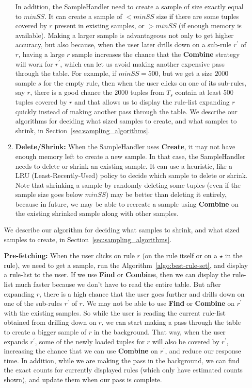 \begin{enumerate}
In addition, the SampleHandler need to create a sample of size exactly equal to $minSS$. It can create a sample of $< minSS$ size if there are some tuples covered by $r$ present in existing samples, or $> minSS$ (if enough memory is available). Making a larger sample is advantageous not only to get higher accuracy, but also because, when the user later drills down on a sub-rule $r^{\prime}$ of $r$, having a large $r$ sample increases the chance that the \textbf{Combine} strategy will work for $r^{\prime}$, which can let us avoid making another expensive pass through the table. For example, if $minSS = 500$, but we get a size $2000$ sample $s$ for the empty rule, then when the user clicks on one of its sub-rules, say $r$, there is a good chance the $2000$ tuples from $T_s$ contain at least $500$ tuples covered by $r$ and that allows us to display the rule-list expanding $r$ quickly instead of making another pass through the table. We describe our algorithms for deciding what sized samples to create, and what samples to shrink, in Section~\ref{sec:sampling_algorithms}.

\item \textbf{Delete/Shrink:} When the SampleHandler uses \textbf{Create}, it may not have enough memory left to create a new sample. In that case, the SampleHandler needs to delete or shrink an existing sample. It can use a heuristic, like a LRU (Least-Recently-Used) policy to decide which sample to delete or shrink. Note that shrinking a sample by randomly deleting some tuples (even if the sample size goes below $minSS$) may be better than deleting it entirely, because in future, we may be able to recreate a sample using \textbf{Combine} on the existing shrinked sample along with other samples.
\end{enumerate}

We describe our algorithm for deciding what samples to shrink, and what sized samples to create, in Section~\ref{sec:sampling_algorithms}. 

\textbf{Pre-fetching:} When the user clicks on rule $r$ (on the rule itself or on a $\star$ in the rule), we need to get a sample, run the Algorithm~\ref{algo:best-rule-set}, and display a rule-list to the user. If we use \textbf{Find} or \textbf{Combine}, then we can display the rule-list much faster because we don't have to read the entire table. But after expanding $r$, there is a high chance that the user goes further and drills down on one of the sub-rules $r^{\prime}$ of $r$. We may not be able to use \textbf{Find} or \textbf{Combine} on $r^{\prime}$ with the existing samples. So while the user is reading the current rule-list obtained from drilling down on $r$, we can start making a pass through the table to create a bigger sample of $r$ in the background. That way, when the user expands $r^{\prime}$, some of the newly loaded tuples for $r$ will also be covered by $r^{\prime}$, increasing the chance that we can use \textbf{Combine} on $r^{\prime}$, and reduce our response time.
In addition, while we are making the pass in the background, we can find the exact counts for currently displayed rules (which only have estimated counts shown), and update them when our pass is complete.

